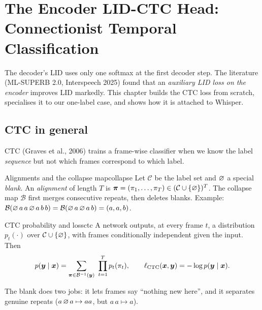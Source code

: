\chapter{The Encoder LID-CTC Head: Connectionist Temporal Classification}
\label{ch:ctc}

The decoder's LID uses only one softmax at the first decoder step. The literature (ML-SUPERB 2.0, Interspeech 2025) found that an
\emph{auxiliary LID loss on the encoder} improves LID markedly. This chapter builds the CTC loss from scratch, specialises it to
our one-label case, and shows how it is attached to Whisper.

\section{CTC in general}

CTC (Graves et al., 2006) trains a frame-wise classifier when we know the label \emph{sequence} but not which frames correspond to
which label.

\begin{definition}{Alignments and the collapse map}{collapse}
Let $\mathcal C$ be the label set and $\varnothing$ a special \emph{blank}. An \emph{alignment} of length $T$ is
$\bm\pi=(\pi_1,\dots,\pi_T)\in(\mathcal C\cup\{\varnothing\})^T$. The collapse map $\mathcal B$ first merges consecutive repeats, then
deletes blanks. Example: $\mathcal B(\varnothing\, a\, a\, \varnothing\, a\, b\, b)=\mathcal B(\varnothing\, a\,\varnothing\, a\, b)=(a,a,b)$.
\end{definition}

\begin{definition}{CTC probability and loss}{ctc}
A network outputs, at every frame $t$, a distribution $p_t(\cdot)$ over $\mathcal C\cup\{\varnothing\}$, with frames conditionally
independent given the input. Then
\[
p(\bm{y}\mid\bm{x})=\sum_{\bm\pi\in\mathcal B^{-1}(\bm{y})}\ \prod_{t=1}^{T}p_t(\pi_t),\qquad
\ell_{\text{CTC}}(\bm{x},\bm{y})=-\log p(\bm{y}\mid\bm{x}).
\]
\end{definition}

The blank does two jobs: it lets frames say ``nothing new here'', and it separates genuine repeats ($a\,\varnothing\,a\mapsto aa$, but
$a\,a\mapsto a$).

